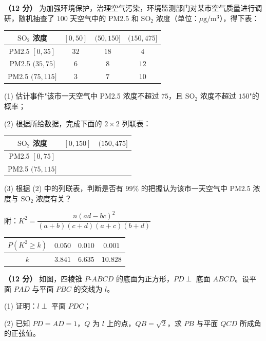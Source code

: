 \begin{question}
\textbf{（12 分）} 为加强环境保护，治理空气污染，环境监测部门对某市空气质量进行调研，随机抽查了 $100$ 天空气中的 PM2.5 和 $\mathrm{SO_2}$ 浓度（单位：$\mu\mathrm g/\mathrm m^{3}$），得下表：

\begin{center}
\begin{tabular}{cccc}
\toprule
$\mathrm{SO_2}$ 浓度 & $[0,50]$ & $(50,150]$ & $(150,475]$ \\
\midrule
PM2.5 $[0,35]$ & $32$ & $18$ & $4$ \\
PM2.5 $(35,75]$ & $6$ & $8$ & $12$ \\
PM2.5 $(75,115]$ & $3$ & $7$ & $10$ \\
\bottomrule
\end{tabular}
\end{center}

  (1) 估计事件"该市一天空气中 PM2.5 浓度不超过 $75$，且 $\mathrm{SO_2}$ 浓度不超过 $150$"的概率；

  (2) 根据所给数据，完成下面的 $2\times2$ 列联表：

\begin{center}
\begin{tabular}{ccc}
\toprule
$\mathrm{SO_2}$ 浓度 & $[0,150]$ & $(150,475]$ \\
\midrule
PM2.5 $[0,75]$ &  &  \\
PM2.5 $(75,115]$ &  &  \\
\bottomrule
\end{tabular}
\end{center}

  (3) 根据 (2) 中的列联表，判断是否有 $99\%$ 的把握认为该市一天空气中 PM2.5 浓度与 $\mathrm{SO_2}$ 浓度有关？

  附：$K^{2}=\dfrac{n(ad-bc)^{2}}{(a+b)(c+d)(a+c)(b+d)}$

\begin{center}
\begin{tabular}{cccc}
\toprule
$P\left(K^{2}\ge k\right)$ & $0.050$ & $0.010$ & $0.001$ \\
\midrule
$k$ & $3.841$ & $6.635$ & $10.828$ \\
\bottomrule
\end{tabular}
\end{center}

\Needspace{0.4\textheight}
\end{question}
\begin{question}
\textbf{（12 分）} 如图，四棱锥 $P\text{-}ABCD$ 的底面为正方形，$PD\perp$ 底面 $ABCD$。设平面 $PAD$ 与平面 $PBC$ 的交线为 $l$。
\nopagebreak[4]
\begin{center}\end{center}
\nopagebreak[4]
  (1) 证明：$l\perp$ 平面 $PDC$；

  (2) 已知 $PD=AD=1$，$Q$ 为 $l$ 上的点，$QB=\sqrt2$，求 $PB$ 与平面 $QCD$ 所成角的正弦值。

\end{question}
